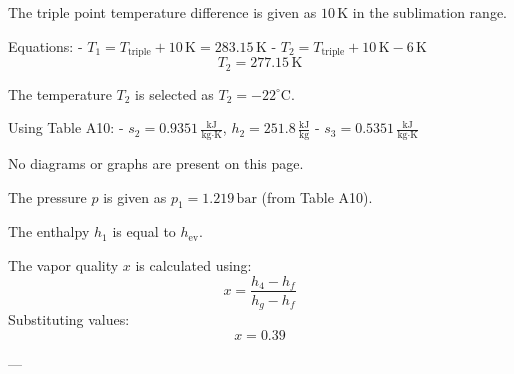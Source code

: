 The triple point temperature difference is given as \( 10 \, \text{K} \) in the sublimation range.  

Equations:  
- \( T_1 = T_{\text{triple}} + 10 \, \text{K} = 283.15 \, \text{K} \)  
- \( T_2 = T_{\text{triple}} + 10 \, \text{K} - 6 \, \text{K} \)  
  \[
  T_2 = 277.15 \, \text{K}
  \]  

The temperature \( T_2 \) is selected as \( T_2 = -22^\circ\text{C} \).  

Using Table A10:  
- \( s_2 = 0.9351 \, \frac{\text{kJ}}{\text{kg·K}} \), \( h_2 = 251.8 \, \frac{\text{kJ}}{\text{kg}} \)  
- \( s_3 = 0.5351 \, \frac{\text{kJ}}{\text{kg·K}} \)  

No diagrams or graphs are present on this page.

The pressure \( p \) is given as \( p_1 = 1.219 \, \text{bar} \) (from Table A10).  

The enthalpy \( h_1 \) is equal to \( h_{\text{ev}} \).  

The vapor quality \( x \) is calculated using:  
\[
x = \frac{h_4 - h_f}{h_g - h_f}
\]  
Substituting values:  
\[
x = 0.39
\]  

---